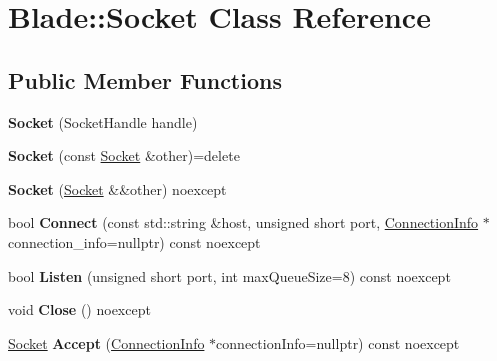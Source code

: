 \hypertarget{class_blade_1_1_socket}{}\section{Blade\+:\+:Socket Class Reference}
\label{class_blade_1_1_socket}
\subsection*{Public Member Functions}
\begin{DoxyCompactItemize}
\item 
\mbox{\label{class_blade_1_1_socket_a0070e8796365ca743b0dbb2bed9c691f}} 
{\bfseries Socket} (Socket\+Handle handle)
\item 
\mbox{\label{class_blade_1_1_socket_a3c8cc7d01135f4e78298048fe6950151}} 
{\bfseries Socket} (const \hyperlink{class_blade_1_1_socket}{Socket} \&other)=delete
\item 
\mbox{\label{class_blade_1_1_socket_a3966e8e3444f85b1a8fae6c9b42e18f0}} 
{\bfseries Socket} (\hyperlink{class_blade_1_1_socket}{Socket} \&\&other) noexcept
\item 
\mbox{\label{class_blade_1_1_socket_a3a7d54bb3818ac3145095dc1f3cf7a51}} 
bool {\bfseries Connect} (const std\+::string \&host, unsigned short port, \hyperlink{struct_blade_1_1_connection_info}{Connection\+Info} $\ast$connection\+\_\+info=nullptr) const noexcept
\item 
\mbox{\label{class_blade_1_1_socket_a801888c94b0ba8cc2ca912a72ee50a1b}} 
bool {\bfseries Listen} (unsigned short port, int max\+Queue\+Size=8) const noexcept
\item 
\mbox{\label{class_blade_1_1_socket_a5806bdcd320ec474de73347f53ccf4f0}} 
void {\bfseries Close} () noexcept
\item 
\mbox{\label{class_blade_1_1_socket_aafaf8dc48b92aec2f7b9589077838859}} 
\hyperlink{class_blade_1_1_socket}{Socket} {\bfseries Accept} (\hyperlink{struct_blade_1_1_connection_info}{Connection\+Info} $\ast$connection\+Info=nullptr) const noexcept

\end{DoxyCompactItemize}
